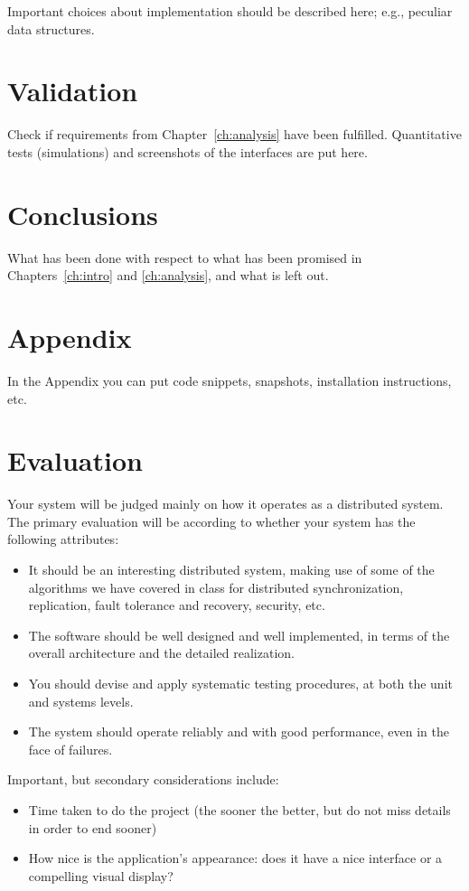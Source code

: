 \documentclass[a4paper, oneside]{memoir}
\begin{document}
Important choices about implementation should be described here; e.g., peculiar data structures.


\chapter{Validation}

Check if requirements from Chapter~\ref{ch:analysis} have been fulfilled.
Quantitative tests (simulations) and screenshots of the interfaces are put here.


\chapter{Conclusions}

What has been done with respect to what has been promised in Chapters~\ref{ch:intro} and \ref{ch:analysis}, and what is left out.

\appendix

\chapter{Appendix}

In the Appendix you can put code snippets, snapshots, installation instructions, etc.


\chapter*{Evaluation}
Your system will be judged mainly on how it operates as a distributed system. The primary evaluation will be according to whether your system has the following attributes:
\begin{itemize}
\item  It should be an interesting distributed system, making use of some of the algorithms we have covered in class for distributed synchronization, replication, fault tolerance and recovery, security, etc.
\item The software should be well designed and well implemented, in terms of the overall architecture and the detailed realization.
\item You should devise and apply systematic testing procedures, at both the unit and systems levels.
\item The system should operate reliably and with good performance, even in the face of failures.
\end{itemize}
Important, but secondary considerations include:
\begin{itemize}
\item Time taken to do the project (the sooner the better, but do not miss details in order to end sooner)
\item  How nice is the application's appearance: does it have a nice interface or a compelling visual display?
\end{itemize}
\end{document}

